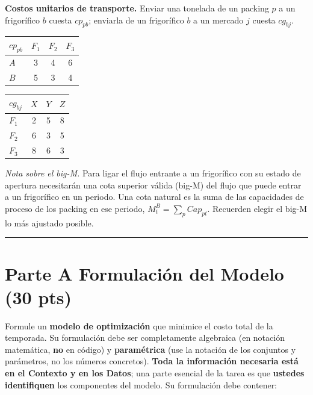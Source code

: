 \documentclass[12pt,a4paper]{article}
\begin{document}
\textbf{Costos unitarios de transporte.} Enviar una tonelada de un packing $p$ a un
frigorífico $b$ cuesta $\mathit{cp}_{pb}$; enviarla de un frigorífico $b$ a un
mercado $j$ cuesta $\mathit{cg}_{bj}$.

\begin{center}
\renewcommand{\arraystretch}{1.2}
\begin{minipage}{0.46\linewidth}\centering
\begin{tabular}{lccc}
\toprule
\textbf{$\mathit{cp}_{pb}$} & $F_1$ & $F_2$ & $F_3$ \\
\midrule
$A$ & 3 & 4 & 6 \\
$B$ & 5 & 3 & 4 \\
\bottomrule
\end{tabular}
\end{minipage}\hfill
\begin{minipage}{0.46\linewidth}\centering
\begin{tabular}{lccc}
\toprule
\textbf{$\mathit{cg}_{bj}$} & $X$ & $Y$ & $Z$ \\
\midrule
$F_1$ & 2 & 5 & 8 \\
$F_2$ & 6 & 3 & 5 \\
$F_3$ & 8 & 6 & 3 \\
\bottomrule
\end{tabular}
\end{minipage}
\end{center}

\noindent\textit{Nota sobre el big-M.} Para ligar el flujo entrante a un
frigorífico con su estado de apertura necesitarán una cota superior válida
(big-M) del flujo que puede entrar a un frigorífico en un periodo. Una cota
natural es la suma de las capacidades de proceso de los packing en ese periodo,
$M^{B}_{t}=\sum_{p}\mathit{Cap}_{pt}$. Recuerden elegir el big-M lo más ajustado
posible.

\noindent\rule{\linewidth}{0.4pt}

\section*{Parte A \quad Formulación del Modelo \hfill\normalfont\normalsize(30 pts)}

Formule un \textbf{modelo de optimización} que minimice el costo total de la
temporada. Su formulación debe ser completamente algebraica (en notación
matemática, \textbf{no} en código) y \textbf{paramétrica} (use la notación de los
conjuntos y parámetros, no los números concretos). \textbf{Toda la información
necesaria está en el Contexto y en los Datos}; una parte esencial de la tarea es
que \textbf{ustedes identifiquen} los componentes del modelo. Su formulación debe
contener:
\end{document}

